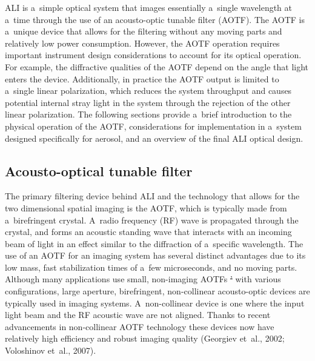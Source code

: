 \documentclass[amtd, online, hvmath]{copernicus}
\providecommand{\DIFdel}[1]{{\protect\color{red}\sout{#1}}}                      %
\providecommand{\DIFdelbegin}{} %
\providecommand{\DIFdelend}{} %
\begin{document}
ALI is a~simple optical system that images essentially a~single
wavelength at a~time through the use of an acousto-optic tunable
filter (AOTF). The AOTF is a~unique device that allows for the
filtering without any moving parts and relatively low power
consumption. However, the AOTF operation requires important instrument
design considerations to account for its optical operation. For
example, the diffractive qualities of the AOTF depend on the angle
that light enters the device. Additionally, in practice the AOTF
output is limited to a~single linear polarization, which reduces the
system throughput and causes potential internal stray light in the
system through the rejection of the other linear polarization. The
following sections provide a~brief introduction to the physical
operation of the AOTF, considerations for implementation in a~system
designed specifically for aerosol, and an overview of the final ALI
optical design.

\subsection{Acousto-optical tunable filter}

The primary filtering device behind ALI and the technology that allows
for the two dimensional spatial imaging is the AOTF, which is
typically made from a~birefringent crystal. A~radio frequency (RF)
wave is propagated through the crystal, and forms an acoustic standing
wave that interacts with an incoming beam of light in an effect
similar to the diffraction of a~specific wavelength. The use of an
AOTF for an imaging system has several distinct advantages due to its
low mass, fast stabilization times of a~few microseconds, and no
moving parts. Although many applications use small, non-imaging AOTFs
\DIFdelbegin \DIFdel{'
}\DIFdelend with various configurations, large aperture, birefringent,
non-collinear acousto-optic devices are typically used in imaging
systems. A~non-collinear device is one where the input light beam and
the RF acoustic wave are not aligned. Thanks to recent advancements in
non-collinear AOTF technology these devices now have relatively high
efficiency and robust imaging quality (Georgiev et~al., 2002;
Voloshinov et~al., 2007).
\end{document}
